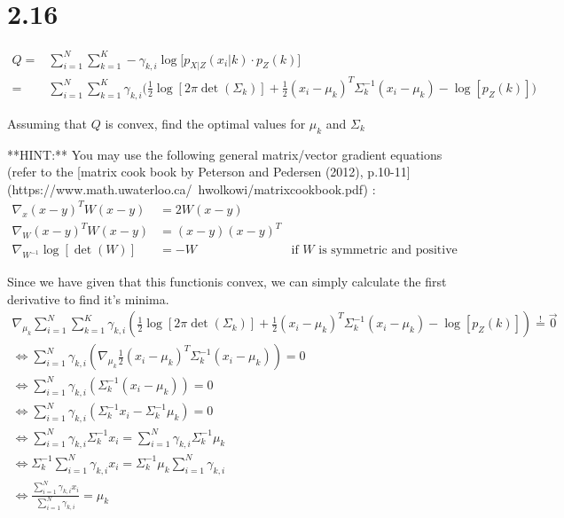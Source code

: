 \documentclass[12pt,paper=a4,twoside]{scrartcl}
\begin{document}
\section*{2.16}
    \begin{align*}
Q = &\sum_{i=1}^N \sum_{k=1}^K -\gamma_{k,i} \log\Big[ p_{X|Z}(x_i|k) \cdot p_Z(k) \Big]\\
=& \sum_{i=1}^N \sum_{k=1}^K \gamma_{k,i} \Big(\frac{1}{2}\log[2\pi \det(\Sigma_k)] + \frac{1}{2} (x_i - \mu_k)^T \Sigma_k^{-1} (x_i - \mu_k) - \log[p_Z(k)]\Big)
\end{align*}

Assuming that $Q$ is convex, find the optimal values for $\mu_k$ and $\Sigma_k$

**HINT:** You may use the following general matrix/vector gradient equations (refer to the [matrix cook book by Peterson and Pedersen (2012), p.10-11](https://www.math.uwaterloo.ca/~hwolkowi/matrixcookbook.pdf) :
\begin{align}
\nabla_x (x - y)^T W (x - y) &= 2 W (x-y) \\
\nabla_W (x - y)^T W (x - y) &= (x-y)(x-y)^T \\
\nabla_{W^{-1}} \log[\det(W)] &= -W & \text{if $W$ is symmetric and positive semi-definite}
\end{align}


Since we have given that this functionis convex, we can simply calculate the first derivative to find it's minima. 
\begin{gather*}
\nabla_{\mu_k} \sum_{i=1}^N \sum_{k=1}^K \gamma_{k,i} \left(\frac{1}{2}\log[2\pi \det(\Sigma_k)] + \frac{1}{2} (x_i - \mu_k)^T \Sigma_k^{-1} (x_i - \mu_k) - \log[p_Z(k)]\right) \stackrel{!}{=} \vec{0}\\
\Leftrightarrow \sum_{i=1}^N \gamma_{k,i} \left( \nabla_{\mu_k} \frac{1}{2} (x_i - \mu_k)^T \Sigma_k^{-1} (x_i - \mu_k) \right) = 0\\
\Leftrightarrow \sum_{i=1}^N \gamma_{k,i} \left( \Sigma^{-1}_k (x_i - \mu_k) \right) = 0\\
\Leftrightarrow \sum_{i=1}^N \gamma_{k,i} \left( \Sigma^{-1}_k x_i - \Sigma^{-1}_k \mu_k \right) = 0\\
\Leftrightarrow \sum_{i=1}^N \gamma_{k,i} \Sigma^{-1}_k x_i = \sum_{i=1}^N  \gamma_{k,i} \Sigma^{-1}_k \mu_k\\
\Leftrightarrow \Sigma_k^{-1} \sum_{i=1}^N \gamma_{k,i} x_i = \Sigma_k^{-1} \mu_k \sum_{i=1}^N \gamma_{k,i}\\
\Leftrightarrow \frac{\sum_{i=1}^N \gamma_{k,i} x_i}{\sum_{i=1}^N \gamma_{k,i}} = \mu_k
\end{gather*}
\end{document}
